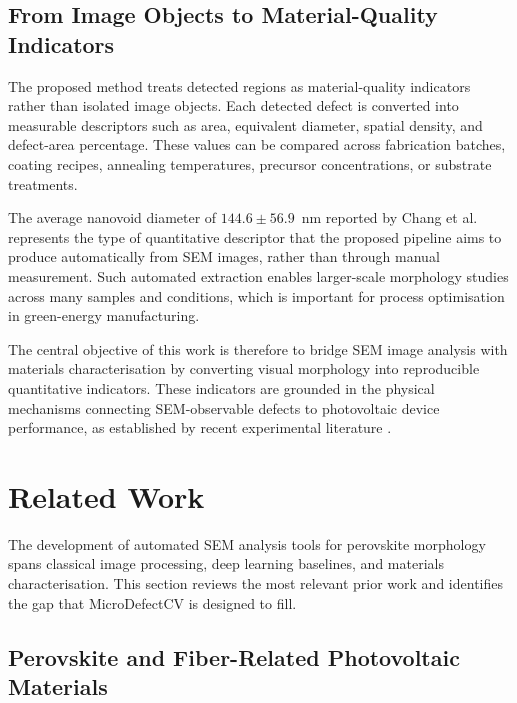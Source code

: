 \documentclass[pdflatex,sn-mathphys-num,iicol]{sn-jnl}
\theoremstyle{thmstyleone}
\theoremstyle{thmstyletwo}
\theoremstyle{thmstylethree}
\begin{document}
\subsection{From Image Objects to Material-Quality Indicators}
\label{subsec:image_to_material}

The proposed method treats detected regions as material-quality
indicators rather than isolated image objects. Each detected defect
is converted into measurable descriptors such as area, equivalent
diameter, spatial density, and defect-area percentage. These values
can be compared across fabrication batches, coating recipes,
annealing temperatures, precursor concentrations, or substrate
treatments.

The average nanovoid diameter of $144.6 \pm 56.9$~nm reported by
Chang et al.\ \cite{chang2026} represents the type of quantitative
descriptor that the proposed pipeline aims to produce automatically
from SEM images, rather than through manual measurement. Such
automated extraction enables larger-scale morphology studies across
many samples and conditions, which is important for process
optimisation in green-energy manufacturing.

The central objective of this work is therefore to bridge SEM image
analysis with materials characterisation by converting visual
morphology into reproducible quantitative indicators. These
indicators are grounded in the physical mechanisms connecting
SEM-observable defects to photovoltaic device performance, as
established by recent experimental literature
\cite{chang2026,zheng2025,hu2023}.


\section{Related Work}\label{sec:related_work}

The development of automated SEM analysis tools for perovskite
morphology spans classical image processing, deep learning
baselines, and materials characterisation. This section reviews the
most relevant prior work and identifies the gap that MicroDefectCV
is designed to fill.

\subsection{Perovskite and Fiber-Related Photovoltaic Materials}
\label{subsec:psc_related_work}
\end{document}
